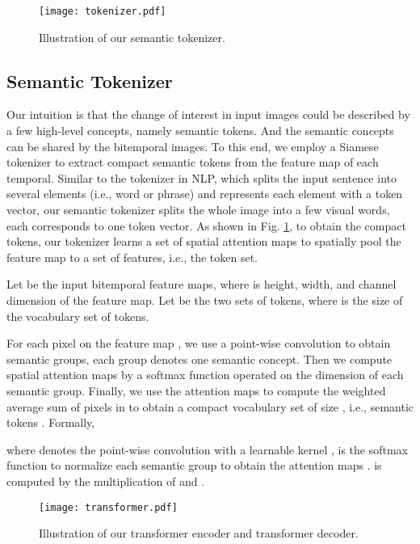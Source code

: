 \documentclass[journal]{IEEEtran}
\begin{document}
\begin{figure}
        \centering
        \texttt{[image: tokenizer.pdf]}   
        \caption{Illustration of our semantic tokenizer.}
        \label{fig:tokenizer}
\end{figure}

\subsection{Semantic Tokenizer}
\label{ssec:tokenizer}


Our intuition is that the change of interest in input images could be described by a few high-level concepts, namely semantic tokens. And the semantic concepts can be shared by the bitemporal images. To this end, we employ a Siamese tokenizer to extract compact semantic tokens from the feature map of each temporal. Similar to the tokenizer in NLP, which splits the input sentence into several elements (i.e., word or phrase) and represents each element with a token vector, our semantic tokenizer splits the whole image into a few visual words, each corresponds to one token vector. As shown in Fig. \ref{fig:tokenizer}, to obtain the compact tokens, our tokenizer learns a set of spatial attention maps to spatially pool the feature map to a set of features, i.e., the token set. 

Let  be the input bitemporal feature maps, where  is height, width, and channel dimension of the feature map. Let  be the two sets of tokens, where  is the size of the vocabulary set of tokens. 

For each pixel  on the feature map , we use a point-wise convolution to obtain  semantic groups, each group denotes one semantic concept. Then we compute spatial attention maps by a softmax function operated on the  dimension of each semantic group. Finally, we use the attention maps to compute the weighted average sum of pixels in  to obtain a compact vocabulary set of size , i.e., semantic tokens . Formally, 

where  denotes the point-wise convolution with a learnable kernel ,  is the softmax function to normalize each semantic group to obtain the attention maps .  is computed by the multiplication of  and .

\begin{figure}
        \centering
        \texttt{[image: transformer.pdf]}   
        \caption{Illustration of our transformer encoder and transformer decoder.}
        \label{fig:transformer}
\end{figure}
\end{document}
